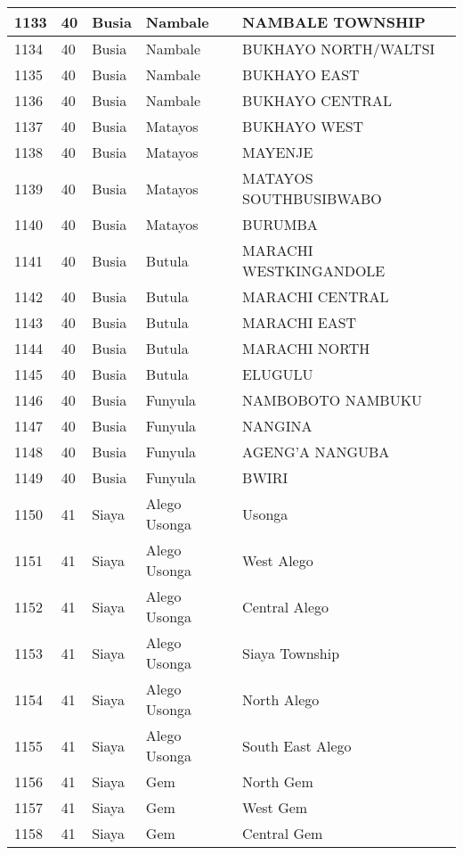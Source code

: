 \begin{table}[!ht]
\begin{tabular}{|l|l|l|l|l|}
        1133 & 40 & Busia & Nambale & NAMBALE TOWNSHIP \\ \hline
        1134 & 40 & Busia & Nambale & BUKHAYO NORTH/WALTSI \\ \hline
        1135 & 40 & Busia & Nambale & BUKHAYO EAST \\ \hline
        1136 & 40 & Busia & Nambale & BUKHAYO CENTRAL \\ \hline
        1137 & 40 & Busia & Matayos & BUKHAYO WEST \\ \hline
        1138 & 40 & Busia & Matayos & MAYENJE \\ \hline
        1139 & 40 & Busia & Matayos & MATAYOS SOUTHBUSIBWABO \\ \hline
        1140 & 40 & Busia & Matayos & BURUMBA \\ \hline
        1141 & 40 & Busia & Butula & MARACHI WESTKINGANDOLE \\ \hline
        1142 & 40 & Busia & Butula & MARACHI CENTRAL \\ \hline
        1143 & 40 & Busia & Butula & MARACHI EAST \\ \hline
        1144 & 40 & Busia & Butula & MARACHI NORTH \\ \hline
        1145 & 40 & Busia & Butula & ELUGULU \\ \hline
        1146 & 40 & Busia & Funyula & NAMBOBOTO NAMBUKU \\ \hline
        1147 & 40 & Busia & Funyula & NANGINA \\ \hline
        1148 & 40 & Busia & Funyula & AGENG’A NANGUBA \\ \hline
        1149 & 40 & Busia & Funyula & BWIRI \\ \hline
        1150 & 41 & Siaya & Alego Usonga & Usonga \\ \hline
        1151 & 41 & Siaya & Alego Usonga & West Alego \\ \hline
        1152 & 41 & Siaya & Alego Usonga & Central Alego \\ \hline
        1153 & 41 & Siaya & Alego Usonga & Siaya Township \\ \hline
        1154 & 41 & Siaya & Alego Usonga & North Alego \\ \hline
        1155 & 41 & Siaya & Alego Usonga & South East Alego \\ \hline
        1156 & 41 & Siaya & Gem & North Gem \\ \hline
        1157 & 41 & Siaya & Gem & West Gem \\ \hline
        1158 & 41 & Siaya & Gem & Central Gem \\ \hline

\end{tabular}
\end{table}
